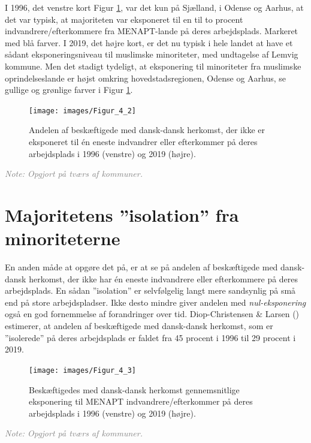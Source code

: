 \documentclass[
]{book}
\begin{document}
I 1996, det venstre kort Figur \ref{fig:fig-5-3}, var det kun på Sjælland, i Odense og Aarhus, at det var typisk, at majoriteten var eksponeret til en til to procent indvandrere/efterkommere fra MENAPT-lande på deres arbejdsplads. Markeret med blå farver. I 2019, det højre kort, er det nu typisk i hele landet at have et sådant eksponeringsniveau til muslimske minoriteter, med undtagelse af Lemvig kommune. Men det stadigt tydeligt, at eksponering til minoriteter fra muslimske oprindelseslande er højst omkring hovedstadsregionen, Odense og Aarhus, se gullige og grønlige farver i Figur \ref{fig:fig-5-3}.

\begin{figure}
\texttt{[image: images/Figur\_4\_2]} \caption{Andelen af beskæftigede med dansk-dansk herkomst, der ikke er eksponeret til én eneste indvandrer eller efterkommer på deres arbejdsplads i 1996 (venstre) og 2019 (højre).}\label{fig:fig-5-3}
\end{figure}

\begin{footnotesize}\textit{\textcolor{gray}{
Note: Opgjort på tværs af kommuner.
}}
\end{footnotesize}

\section{Majoritetens ''isolation'' fra minoriteterne}\label{majoritetens-isolation-fra-minoriteterne}

En anden måde at opgøre det på, er at se på andelen af beskæftigede med dansk-dansk herkomst, der ikke har én eneste indvandrere eller efterkommere på deres arbejdsplads. En sådan ''isolation'' er selvfølgelig langt mere sandsynlig på små end på store arbejdspladser. Ikke desto mindre giver andelen med \emph{nul-eksponering} også en god fornemmelse af forandringer over tid. Diop-Christensen \& Larsen () estimerer, at andelen af beskæftigede med dansk-dansk herkomst, som er ''isolerede'' på deres arbejdsplads er faldet fra 45 procent i 1996 til 29 procent i 2019.

\begin{figure}
\texttt{[image: images/Figur\_4\_3]} \caption{Beskæftigedes med dansk-dansk herkomst gennemsnitlige eksponering til MENAPT indvandrere/efterkommer på deres arbejdsplads i 1996 (venstre) og 2019 (højre).}\label{fig:fig-5-4}
\end{figure}

\begin{footnotesize}\textit{\textcolor{gray}{
Note: Opgjort på tværs af kommuner.
}}
\end{footnotesize}
\end{document}
